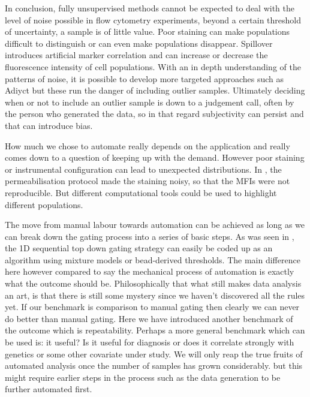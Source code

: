 In conclusion, fully unsupervised methods cannot be expected to deal with the level of noise possible in flow cytometry experiments, beyond a certain threshold of uncertainty, a sample is of little value.
Poor staining can make populations difficult to distinguish or can even make populations disappear.
Spillover introduces artificial marker correlation and can increase or decrease the fluorescence intensity of cell populations.  
With an in depth understanding of the patterns of noise, it is possible to develop more targeted approaches such as Adiyct but these run the danger of including outlier samples.
Ultimately deciding when or not to include an outlier sample is down to a judgement call, often by the person who generated the data, so in that regard subjectivity can persist and that can introduce bias.


How much we chose to automate really depends on the application and really comes down to a question of keeping up with the demand.
However poor staining or instrumental configuration can lead to unexpected distributions.
In , the permeabilisation protocol made the staining noisy, so that the MFIs were not reproducible.
But different computational tools could be used to highlight different populations.

The move from manual labour towards automation can be achieved as long as we can break down the gating process into a series of basic steps. 
As was seen in , the 1D sequential top down gating strategy can easily be coded up as an algorithm using mixture models or bead-derived thresholds.  
The main difference here however compared to say the mechanical process of automation is exactly what the outcome should be.
Philosophically that what still makes data analysis an art, is that there is still some mystery since we haven't discovered all the rules yet.
If our benchmark is comparison to manual gating then clearly we can never do better than manual gating.
Here we have introduced another benchmark of the outcome which is repeatability.
Perhaps a more general benchmark which can be used is: it useful?
Is it useful for diagnosis or does it correlate strongly with genetics or some other covariate under study.
We will only reap the true fruits of automated analysis once the number of samples has grown considerably.
but this might require earlier steps in the process such as the data generation to be further automated first.


